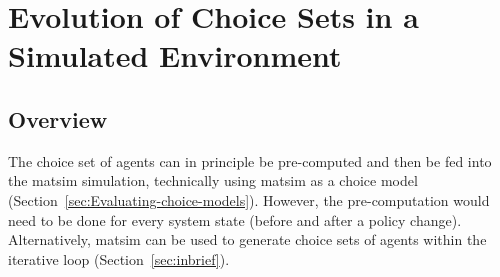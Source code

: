 \section{Evolution of Choice Sets in a Simulated
Environment}
\label{sec:Evolution-of-choice}

\subsection{Overview}

The choice set of agents can in principle be pre-computed and then be fed into the \acrshort{matsim} simulation, technically using \gls{matsim} as a choice model (Section~\ref{sec:Evaluating-choice-models}).
%
However, the pre-computation would need to be done for every system state (\eg before and after a policy change). Alternatively, \acrshort{matsim} can be used to generate choice sets of agents within the iterative loop (Section~\ref{sec:inbrief}).
%
%

